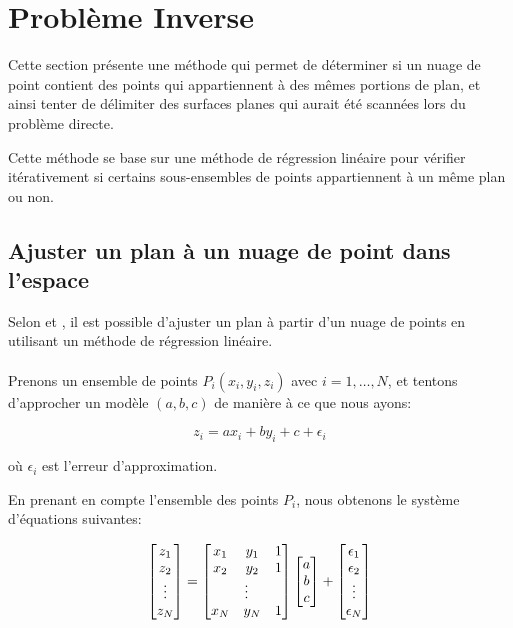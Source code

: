 \documentclass[12pt,a4paper]{report}
\begin{document}
\section{Problème Inverse}

Cette section présente une méthode qui permet de déterminer si un nuage de point contient des points qui appartiennent à des mêmes portions de plan, et ainsi tenter de délimiter des surfaces planes qui aurait été scannées lors du problème directe.

Cette méthode se base sur une méthode de régression linéaire pour vérifier itérativement si certains sous-ensembles de points appartiennent à un même plan ou non. 

\subsection{Ajuster un plan à un nuage de point dans l'espace} \label{sec:reglin}

Selon \cite{tarantola_inverse_2005} et \cite{bremer_multiple_2012}, il est possible d'ajuster un plan à partir d'un nuage de points en utilisant un méthode de régression linéaire.

\paragraph{}
Prenons un ensemble de points $P_i(x_i,y_i, z_i)$ avec $i = 1, \dots, N$, et tentons d'approcher un modèle $(a,b,c)$ de manière à ce que nous ayons: 

\begin{equation}
	z_i = ax_i + by_i + c + \epsilon_i
\end{equation}

où $\epsilon_i$ est l'erreur d'approximation.

En prenant en compte l'ensemble des points $P_i$, nous obtenons le système d'équations suivantes:

\begin{equation}
\label{fullsyst}
\begin{bmatrix} z_1 \\ z_2 \\ \vdots \\ z_N \end{bmatrix}
=
\begin{bmatrix}
x_1 & y_1 & 1 \\
x_2 & y_2 & 1 \\ 
\multicolumn{3}{c}{$\vdots$} \\
x_N & y_N & 1
\end{bmatrix}
\begin{bmatrix} a \\ b \\ c \end{bmatrix}
+
\begin{bmatrix} \epsilon_1 \\ \epsilon_2 \\ \vdots \\ \epsilon_N \end{bmatrix}
\end{equation}
\end{document}
